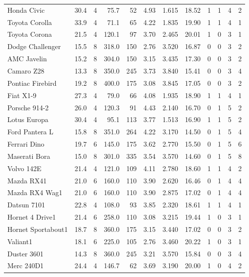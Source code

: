 \documentclass[a4paper, nobind]{templates/ociamthesis}
\begin{document}
\begin{longtable}{lrrrrrrrrrrr}
Honda Civic & 30.4 & 4 & 75.7 & 52 & 4.93 & 1.615 & 18.52 & 1 & 1 & 4 & 2\\
Toyota Corolla & 33.9 & 4 & 71.1 & 65 & 4.22 & 1.835 & 19.90 & 1 & 1 & 4 & 1\\
\addlinespace
Toyota Corona & 21.5 & 4 & 120.1 & 97 & 3.70 & 2.465 & 20.01 & 1 & 0 & 3 & 1\\
Dodge Challenger & 15.5 & 8 & 318.0 & 150 & 2.76 & 3.520 & 16.87 & 0 & 0 & 3 & 2\\
AMC Javelin & 15.2 & 8 & 304.0 & 150 & 3.15 & 3.435 & 17.30 & 0 & 0 & 3 & 2\\
Camaro Z28 & 13.3 & 8 & 350.0 & 245 & 3.73 & 3.840 & 15.41 & 0 & 0 & 3 & 4\\
Pontiac Firebird & 19.2 & 8 & 400.0 & 175 & 3.08 & 3.845 & 17.05 & 0 & 0 & 3 & 2\\
\addlinespace
Fiat X1-9 & 27.3 & 4 & 79.0 & 66 & 4.08 & 1.935 & 18.90 & 1 & 1 & 4 & 1\\
Porsche 914-2 & 26.0 & 4 & 120.3 & 91 & 4.43 & 2.140 & 16.70 & 0 & 1 & 5 & 2\\
Lotus Europa & 30.4 & 4 & 95.1 & 113 & 3.77 & 1.513 & 16.90 & 1 & 1 & 5 & 2\\
Ford Pantera L & 15.8 & 8 & 351.0 & 264 & 4.22 & 3.170 & 14.50 & 0 & 1 & 5 & 4\\
Ferrari Dino & 19.7 & 6 & 145.0 & 175 & 3.62 & 2.770 & 15.50 & 0 & 1 & 5 & 6\\
\addlinespace
Maserati Bora & 15.0 & 8 & 301.0 & 335 & 3.54 & 3.570 & 14.60 & 0 & 1 & 5 & 8\\
Volvo 142E & 21.4 & 4 & 121.0 & 109 & 4.11 & 2.780 & 18.60 & 1 & 1 & 4 & 2\\
Mazda RX41 & 21.0 & 6 & 160.0 & 110 & 3.90 & 2.620 & 16.46 & 0 & 1 & 4 & 4\\
Mazda RX4 Wag1 & 21.0 & 6 & 160.0 & 110 & 3.90 & 2.875 & 17.02 & 0 & 1 & 4 & 4\\
Datsun 7101 & 22.8 & 4 & 108.0 & 93 & 3.85 & 2.320 & 18.61 & 1 & 1 & 4 & 1\\
\addlinespace
Hornet 4 Drive1 & 21.4 & 6 & 258.0 & 110 & 3.08 & 3.215 & 19.44 & 1 & 0 & 3 & 1\\
Hornet Sportabout1 & 18.7 & 8 & 360.0 & 175 & 3.15 & 3.440 & 17.02 & 0 & 0 & 3 & 2\\
Valiant1 & 18.1 & 6 & 225.0 & 105 & 2.76 & 3.460 & 20.22 & 1 & 0 & 3 & 1\\
Duster 3601 & 14.3 & 8 & 360.0 & 245 & 3.21 & 3.570 & 15.84 & 0 & 0 & 3 & 4\\
Merc 240D1 & 24.4 & 4 & 146.7 & 62 & 3.69 & 3.190 & 20.00 & 1 & 0 & 4 & 2\\

\end{longtable}
\end{document}
